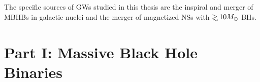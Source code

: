




 
 

 



The specific sources of GWs studied in this thesis are the inspiral and merger
of MBHBs in galactic nuclei and the merger of magnetized NSs with $\gsim 10
\Msun$ BHs.

\section{Part I: Massive Black Hole Binaries}
